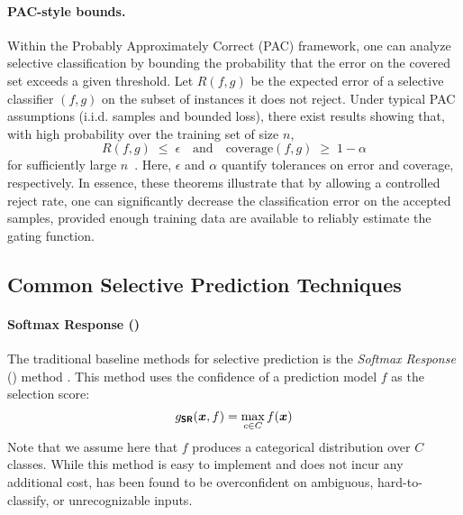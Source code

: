 \paragraph{PAC-style bounds.}
Within the Probably Approximately Correct (PAC) framework, one can analyze selective classification by bounding the probability that the error on the covered set exceeds a given threshold. Let $R(f,g)$ be the expected error of a selective classifier $(f,g)$ on the subset of instances it does not reject. Under typical PAC assumptions (i.i.d. samples and bounded loss), there exist results showing that, with high probability over the training set of size $n$,
\begin{equation}
R(f,g) \;\le\; \epsilon \quad \text{and} \quad \text{coverage}(f,g) \;\geq\; 1-\alpha
\end{equation}
for sufficiently large $n$~\citep{cortes2016learning}. Here, $\epsilon$ and $\alpha$ quantify tolerances on error and coverage, respectively. In essence, these theorems illustrate that by allowing a controlled reject rate, one can significantly decrease the classification error on the accepted samples, provided enough training data are available to reliably estimate the gating function.

\subsection{Common Selective Prediction Techniques}

\paragraph{Softmax Response (\sr)} The traditional baseline methods for selective prediction is the \emph{Softmax Response} (\sr) method \citep{hendrycks2016baseline, geifman2017selective}. This method uses the confidence of a prediction model $f$ as the selection score:
\begin{equation}
	g_{\textbf{\sffamily SR}}(\bm{x}, f) = \max_{c \in C} f(\bm{x})
\end{equation}
Note that we assume here that $f$ produces a categorical distribution over $C$ classes. While this method is easy to implement and does not incur any additional cost, \sr has been found to be overconfident on ambiguous, hard-to-classify, or unrecognizable inputs.

